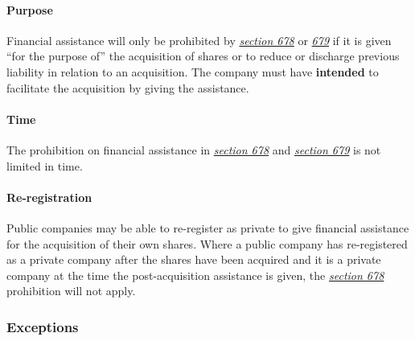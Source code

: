 \documentclass[
]{article}
\begin{document}
\hypertarget{purpose}{%
\paragraph{Purpose}\label{purpose}}

Financial assistance will only be prohibited by
\emph{\href{https://uk.westlaw.com/5-505-7258?originationContext=document\&transitionType=PLDocumentLink\&contextData=(sc.Default)\&ppcid=52c063520c5f48d8a198d13504dc80c1}{section
678}} or
\emph{\href{https://uk.westlaw.com/6-506-2056?originationContext=document\&transitionType=PLDocumentLink\&contextData=(sc.Default)\&ppcid=52c063520c5f48d8a198d13504dc80c1}{679}}
if it is given ``for the purpose of'' the acquisition of shares or to
reduce or discharge previous liability in relation to an acquisition.
The company must have \textbf{intended} to facilitate the acquisition by
giving the assistance.

\hypertarget{time}{%
\paragraph{Time}\label{time}}

The prohibition on financial assistance in
\emph{\href{https://uk.westlaw.com/5-505-7258?originationContext=document\&transitionType=PLDocumentLink\&contextData=(sc.Default)\&ppcid=52c063520c5f48d8a198d13504dc80c1}{section
678}} and
\emph{\href{https://uk.westlaw.com/6-506-2056?originationContext=document\&transitionType=PLDocumentLink\&contextData=(sc.Default)\&ppcid=52c063520c5f48d8a198d13504dc80c1}{section
679}} is not limited in time.

\hypertarget{re-registration}{%
\paragraph{Re-registration}\label{re-registration}}

Public companies may be able to re-register as private to give financial
assistance for the acquisition of their own shares. Where a public
company has re-registered as a private company after the shares have
been acquired and it is a private company at the time the
post-acquisition assistance is given, the
\emph{\href{https://uk.westlaw.com/5-505-7258?originationContext=document\&transitionType=PLDocumentLink\&contextData=(sc.Default)\&ppcid=52c063520c5f48d8a198d13504dc80c1}{section
678}} prohibition will not apply.

\hypertarget{exceptions}{%
\subsubsection{Exceptions}\label{exceptions}}
\end{document}
